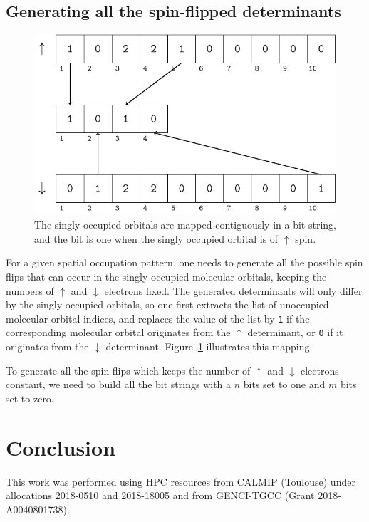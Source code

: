 \documentclass[aip,jcp,reprint,showkeys]{revtex4-1}
\newcommand{\up}{\uparrow}
\newcommand{\dn}{\downarrow}
\newcommand{\sop}{spatial occupation pattern}
\begin{document}
\subsection{Generating all the spin-flipped determinants}

\begin{figure}
\includegraphics[width=0.9\columnwidth]{mapping}
\caption{The singly occupied orbitals are mapped contiguously in a bit string,
and the bit is one when the singly occupied orbital is of $\up$ spin.}
\label{fig:mapping}
\end{figure}


For a given {\sop}, one needs to generate all the possible spin flips that can
occur in the singly occupied molecular orbitals, keeping the numbers of $\up$
and $\dn$ electrons fixed. The generated determinants will only differ by the
singly occupied orbitals, so one first extracts the list of unoccupied molecular
orbital indices, and replaces the value of the list by 
\texttt{1} if the corresponding molecular orbital originates from the $\up$
determinant, or \texttt{0} if it originates from the $\dn$ determinant. 
Figure~\ref{fig:mapping} illustrates this mapping.

To generate all the spin flips which keeps the number of $\up$ and $\dn$
electrons constant, we need to build all the bit strings with a $n$
bits set to one and $m$ bits set to zero. 














\section{Conclusion}


\begin{acknowledgments}
This work was performed using HPC resources from CALMIP (Toulouse) under
allocations 2018-0510 and 2018-18005 and from GENCI-TGCC (Grant
2018-A0040801738).
\end{acknowledgments}



\end{document}
